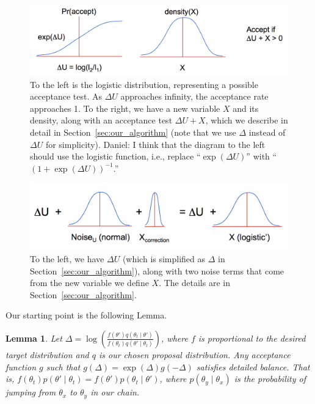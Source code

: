 \documentclass{article}
\newtheorem{lemma}{Lemma}
\begin{document}
\begin{figure}[t]
  \centering
  \includegraphics[width=\textwidth]{john_bair_fig01}
  \caption{
  To the left is the logistic distribution, representing a possible acceptance test. As $\Delta U$
  approaches infinity, the acceptance rate approaches 1. To the right, we have a new variable $X$
  and its density, along with an acceptance test $\Delta U + X$, which we describe in detail in
  Section~\ref{sec:our_algorithm} (note that we use $\Delta$ instead of $\Delta U$ for simplicity).
  {\color{blue}
  Daniel: I think that the diagram to the left should use the logistic function, i.e., replace
  ``$\exp(\Delta U)$'' with ``$(1+\exp(\Delta U))^{-1}$.''
  }
  }
  \label{fig:part1}
\end{figure}

\begin{figure}[t]
  \centering
  \includegraphics[width=\textwidth]{john_bair_fig02}
  \caption{
  To the left, we have $\Delta U$ (which is simplified as $\Delta$ in
  Section~\ref{sec:our_algorithm}), along with two noise terms that come from the new variable we
  define $X$. The details are in Section~\ref{sec:our_algorithm}.
  }
  \label{fig:part2}
\end{figure}

Our starting point is the following Lemma.

\begin{lemma}\label{lem:detailed_balance}
Let $\Delta = \log \left(\frac{f(\theta') q(\theta_t \mid \theta')}{f(\theta_t) q(\theta'\mid
\theta_t)} \right)$, where $f$ is proportional to the desired target distribution and $q$ is our
chosen proposal distribution. Any acceptance function $g$ such that $g(\Delta) = \exp(\Delta)
g(-\Delta )$ satisfies detailed balance. That is, $f(\theta_t)p(\theta' \mid \theta_t) =
f(\theta')p(\theta_t \mid \theta')$, where $p(\theta_y \mid \theta_x)$ is the probability of jumping
from $\theta_x$ to $\theta_y$ in our chain.
\end{lemma}
\end{document}
